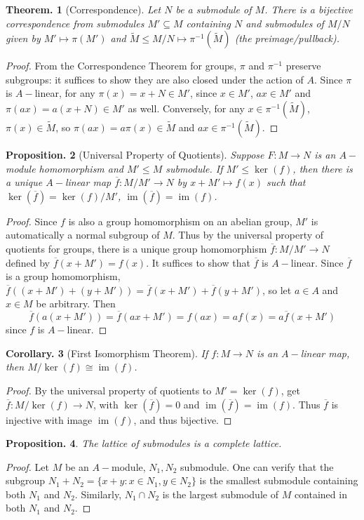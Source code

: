 \documentclass[11pt, a4paper]{memoir}
\theoremstyle{change}
\newtheorem{theorem}{Theorem.}[section]
\newtheorem{corollary}[theorem]{Corollary.}
\newtheorem{proposition}[theorem]{Proposition.}
\theoremstyle{plain}
\theoremstyle{nonumberplain}
\newtheorem{proof}{Proof}
\DeclareMathOperator{\im}{im}
\numberwithin{equation}{section}
\begin{document}
\begin{theorem}[Correspondence]
    Let $N$ be a submodule of $M$.
    There is a bijective correspondence from submodules $M'\subseteq M$ containing $N$ and submodules of $M/N$ given by $M'\mapsto\pi(M')$ and $\tilde M\leq M/N\mapsto \pi^{-1}(\tilde M)$ (the preimage/pullback).
\end{theorem}
\begin{proof}
    From the Correspondence Theorem for groups, $\pi$ and $\pi^{-1}$ preserve subgroups: it suffices to show they are also closed under the action of $A$.
    Since $\pi$ is $A-$linear, for any $\pi(x)=x+N\in M'$, since $x\in M'$, $ax\in M'$ and $\pi(ax)=a(x+N)\in M'$ as well.
    Conversely, for any $x\in\pi^{-1}(\tilde M)$, $\pi(x)\in\tilde M$, so $\pi(ax)=a\pi(x)\in\tilde M$ and $ax\in\pi^{-1}(\tilde M)$.
\end{proof}
\begin{proposition}[Universal Property of Quotients]
    Suppose $F:M\to N$ is an $A-$module homomorphism and $M'\leq M$ submodule.
    If $M'\leq\ker(f)$, then there is a unique $A-$linear map $\overline{f}:M/M'\to N$ by $x+M'\mapsto f(x)$ such that $\ker(\overline{f})=\ker(f)/M'$, $\im(\overline{f})=\im(f)$.
\end{proposition}
\begin{proof}
    Since $f$ is also a group homomorphism on an abelian group, $M'$ is automatically a normal subgroup of $M$.
    Thus by the universal property of quotients for groups, there is a unique group homomorphism $\overline{f}:M/M'\to N$ defined by $\overline{f}(x+M')=f(x)$.
    It suffices to show that $\overline{f}$ is $A-$linear.
    Since $\overline{f}$ is a group homomorphism, $\overline{f}( (x+M')+(y+M'))=\overline{f}(x+M')+\overline{f}(y+M')$, so let $a\in A$ and $x\in M$ be arbitrary.
    Then
    \begin{equation*}
        \overline{f}(a(x+M'))=\overline{f}(ax+M')=f(ax)=af(x)=a\overline{f}(x+M')
    \end{equation*}
    since $f$ is $A-$linear.
\end{proof}
\begin{corollary}[First Isomorphism Theorem]
    If $f:M\to N$ is an $A-$linear map, then $M/\ker(f)\cong\im(f)$.
\end{corollary}
\begin{proof}
    By the universal property of quotients to $M'=\ker(f)$, get $\overline{f}:M/\ker(f)\to N$, with $\ker(\overline{f})=0$ and $\im(\overline{f})=\im(f)$.
    Thus $\overline{f}$ is injective with image $\im(f)$, and thus bijective.
\end{proof}
\begin{proposition}
    The lattice of submodules is a complete lattice.
\end{proposition}
\begin{proof}
    Let $M$ be an $A-$module, $N_1,N_2$ submodule.
    One can verify that the subgroup $N_1+N_2=\{x+y:x\in N_1,y\in N_2\}$ is the smallest submodule containing both $N_1$ and $N_2$.
    Similarly, $N_1\cap N_2$ is the largest submodule of $M$ contained in both $N_1$ and $N_2$.
\end{proof}
\end{document}
